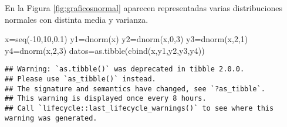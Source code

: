 \documentclass[
]{book}
\newenvironment{Shaded}{\begin{snugshade}}{\end{snugshade}}
\newcommand{\AttributeTok}[1]{\textcolor[rgb]{0.77,0.63,0.00}{#1}}
\newcommand{\DecValTok}[1]{\textcolor[rgb]{0.00,0.00,0.81}{#1}}
\newcommand{\FloatTok}[1]{\textcolor[rgb]{0.00,0.00,0.81}{#1}}
\newcommand{\FunctionTok}[1]{\textcolor[rgb]{0.00,0.00,0.00}{#1}}
\newcommand{\NormalTok}[1]{#1}
\newcommand{\OtherTok}[1]{\textcolor[rgb]{0.56,0.35,0.01}{#1}}
\newcommand{\SpecialCharTok}[1]{\textcolor[rgb]{0.00,0.00,0.00}{#1}}
\newcommand{\StringTok}[1]{\textcolor[rgb]{0.31,0.60,0.02}{#1}}
\theoremstyle{definition}
\theoremstyle{definition}
\theoremstyle{definition}
\theoremstyle{definition}
\theoremstyle{remark}
\begin{document}
En la Figura \ref{fig:graficosnormal} aparecen representadas varias distribuciones normales con distinta media y varianza.

\begin{Shaded}
\begin{Highlighting}[]
\NormalTok{x}\OtherTok{=}\FunctionTok{seq}\NormalTok{(}\SpecialCharTok{{-}}\DecValTok{10}\NormalTok{,}\DecValTok{10}\NormalTok{,}\FloatTok{0.1}\NormalTok{)}
\NormalTok{y1}\OtherTok{=}\FunctionTok{dnorm}\NormalTok{(x)}
\NormalTok{y2}\OtherTok{=}\FunctionTok{dnorm}\NormalTok{(x,}\DecValTok{0}\NormalTok{,}\DecValTok{3}\NormalTok{)}
\NormalTok{y3}\OtherTok{=}\FunctionTok{dnorm}\NormalTok{(x,}\DecValTok{2}\NormalTok{,}\DecValTok{1}\NormalTok{)}
\NormalTok{y4}\OtherTok{=}\FunctionTok{dnorm}\NormalTok{(x,}\DecValTok{2}\NormalTok{,}\DecValTok{3}\NormalTok{)}
\NormalTok{datos}\OtherTok{=}\FunctionTok{as.tibble}\NormalTok{(}\FunctionTok{cbind}\NormalTok{(x,y1,y2,y3,y4))}
\end{Highlighting}
\end{Shaded}

\begin{verbatim}
## Warning: `as.tibble()` was deprecated in tibble 2.0.0.
## Please use `as_tibble()` instead.
## The signature and semantics have changed, see `?as_tibble`.
## This warning is displayed once every 8 hours.
## Call `lifecycle::last_lifecycle_warnings()` to see where this warning was generated.
\end{verbatim}

\begin{Shaded}
\end{Shaded}
\end{document}
